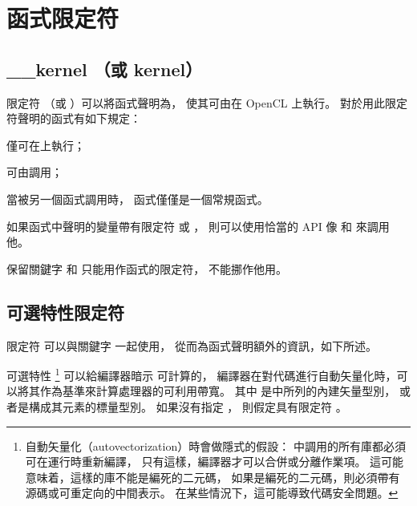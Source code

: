 \section[sec:funcQlf]{函式限定符}

\subsection{__kernel （或 kernel）}

限定符  （或 ）可以將函式聲明為，
使其可由在 OpenCL 上執行。
對於用此限定符聲明的函式有如下規定：
\startigBase
\item 僅可在上執行；
\item 可由調用；
\item 當被另一個函式調用時，  函式僅僅是一個常規函式。
\stopigBase

\startnotepar
如果函式中聲明的變量帶有限定符  或 ，
則可以使用恰當的 API
 像  和  來調用他。

保留關鍵字  和  只能用作函式的限定符，
不能挪作他用。
\stopnotepar

\subsection[sec:optAttrQlf]{可選特性限定符}

限定符  可以與關鍵字  一起使用，
從而為函式聲明額外的資訊，如下所述。

可選特性 \footnote{
自動矢量化（autovectorization）時會做隱式的假設：
  中調用的所有庫都必須可在運行時重新編譯，
只有這樣，編譯器才可以合併或分離作業項。
這可能意味着，這樣的庫不能是編死的二元碼，
如果是編死的二元碼，則必須帶有源碼或可重定向的中間表示。
在某些情況下，這可能導致代碼安全問題。}
 可以給編譯器暗示  可計算的{}，
編譯器在對代碼進行自動矢量化時，可以將其作為基準來計算處理器的可利用帶寬。
其中  是中所列的內建矢量型別，
或者是構成其元素的標量型別。
如果沒有指定 ，
則假定具有限定符 。

